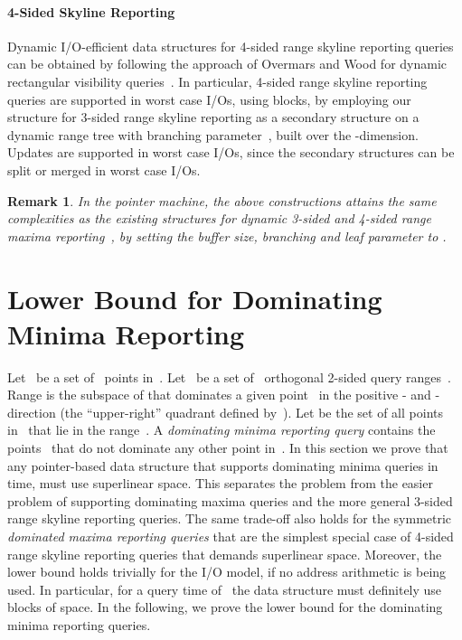 \documentclass[]{article}
\newtheorem{remark}{Remark}[section]
\begin{document}
\begin{fullenv}
\paragraph{4-Sided Skyline Reporting}

Dynamic I/O-efficient data structures for 4-sided range skyline reporting
queries can be obtained by following the approach of Overmars and Wood for
dynamic rectangular visibility queries~\cite{OW88}. In particular, 4-sided range
skyline reporting queries are supported in  worst case I/Os, using
 blocks, by employing our structure
for 3-sided range skyline reporting as a secondary structure on a dynamic range
tree with branching parameter~, built over the -dimension. Updates are
supported in  worst case
I/Os, since the secondary structures can be split or merged in
 worst case I/Os.

\begin{remark}
  In the pointer machine, the above constructions attains the same
  complexities as the existing structures for dynamic 3-sided and
  4-sided range maxima reporting~\cite{BT11}, by setting the buffer
  size, branching and leaf parameter to .
\end{remark}
\end{fullenv}

\section{Lower Bound for Dominating Minima Reporting} \label{sec:dommaxlb} 


Let~ be a set of~ points in~. Let~ be
a set of~ orthogonal 2-sided query ranges~. Range 
is the subspace of  that dominates a given point~ in the positive - and - direction (the ``upper-right''
quadrant defined by~). Let  be the set of all points in~
that lie in the range~. A \textit{dominating minima reporting query} 
contains the points~ that do not dominate any other point
in~. In this section we prove that any pointer-based data structure that
supports dominating minima queries in~ time, must
use superlinear space. This separates the problem from the easier problem of
supporting dominating maxima queries and the more general 3-sided range skyline
reporting queries. The same trade-off also holds for the symmetric
\textit{dominated maxima reporting queries} that are the simplest special case
of 4-sided range skyline reporting queries that demands superlinear space.
Moreover, the lower bound holds trivially for the I/O model, if no address
arithmetic is being used. In particular, for a query time of~ the data structure must definitely
use~ blocks of space. In the
following, we prove the lower bound for the dominating minima reporting queries.
\end{document}
